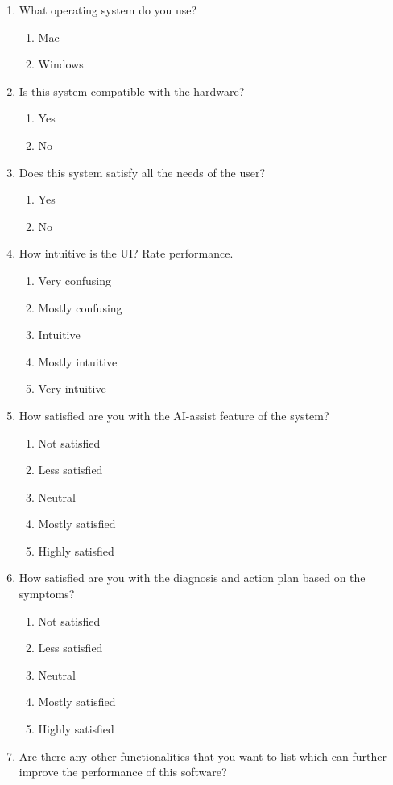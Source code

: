 \documentclass{article}
\begin{document}
\begin{enumerate}
    \item What operating system do you use?
    \begin{enumerate}
        \item Mac
        \item Windows
    \end{enumerate}

    \item Is this system compatible with the hardware?
    \begin{enumerate}
        \item Yes
        \item No
    \end{enumerate}

    \item Does this system satisfy all the needs of the user?
    \begin{enumerate}
        \item Yes
        \item No
    \end{enumerate}

    \item How intuitive is the UI? Rate performance.
    \begin{enumerate}
        \item Very confusing
        \item Mostly confusing
        \item Intuitive
        \item Mostly intuitive
        \item Very intuitive
    \end{enumerate}

    \item How satisfied are you with the AI-assist feature of the system?
    \begin{enumerate}
        \item Not satisfied
        \item Less satisfied
        \item Neutral
        \item Mostly satisfied
        \item Highly satisfied
    \end{enumerate}

    \item How satisfied are you with the diagnosis and action plan based on the symptoms?
    \begin{enumerate}
        \item Not satisfied
        \item Less satisfied
        \item Neutral
        \item Mostly satisfied
        \item Highly satisfied
    \end{enumerate}

    \item Are there any other functionalities that you want to list which can further improve the performance of this software?
\end{enumerate}
\end{document}
